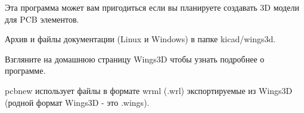 
Эта программа может вам пригодиться если вы планируете создавать 3D модели для PCB элементов.

Архив и файлы документации (Linux и Windows) в папке kicad/wings3d.

Взгляните на домашнюю страницу Wings3D чтобы узнать подробнее о программе.

pcbnew использует файлы в формате wrml (.wrl) экспортируемые из Wings3D (родной формат Wings3D - это .wings).

\secdown
{}




% 
\secup

